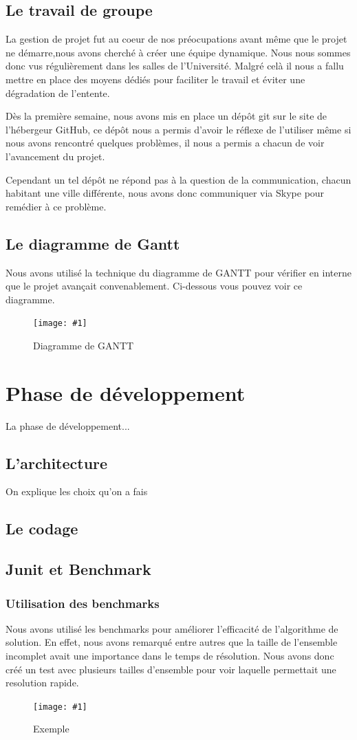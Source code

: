 ﻿\documentclass[a4paper,twoside,12pt]{report}
\newcommand{\monimage}[3]{
\par\noindent
\begin{figure}[H] %
\begin{center}
\texttt{[image: \#1]} %
\caption{#2} %
\label{#3} %
\end{center}
\end{figure} %
}
\begin{document}
\section{Le travail de groupe}
%
\par
La gestion de projet fut au coeur de nos préocupations avant même que le projet ne démarre,nous avons cherché à créer une équipe dynamique. Nous nous sommes donc vus régulièrement dans les salles de l'Université. Malgré celà il nous a fallu mettre en place des moyens dédiés pour faciliter le travail et éviter une dégradation de l'entente.
\par\noindent
 Dès la première semaine, nous avons mis en place un dépôt git sur le site de l'hébergeur GitHub, ce dépôt nous a permis d'avoir le réflexe de l'utiliser même  si nous avons rencontré quelques problèmes, il nous a permis a chacun de voir l'avancement du projet.
\par\noindent
 Cependant un tel dépôt ne répond pas à la question de la communication, chacun habitant une ville différente, nous avons donc communiquer via Skype pour remédier à ce problème.
\section{Le diagramme de Gantt}
%
\par
Nous avons utilisé la technique du diagramme de GANTT pour vérifier en interne que le projet avançait convenablement. Ci-dessous vous pouvez voir ce
diagramme.
\monimage{DiagrammeDeGantt.pdf}{Diagramme de GANTT}{DG}
\chapter{Phase de développement}
%
La phase de développement...
\section{L'architecture}
On explique les choix qu'on a fais
\section{Le codage}
%
\section{Junit et Benchmark}
%
\subsection{Utilisation des benchmarks}
\par
Nous avons utilisé les benchmarks pour améliorer l'efficacité de l'algorithme de solution. En effet, nous avons remarqué entre autres que la taille de l'ensemble incomplet avait une importance dans le temps de résolution. Nous avons donc créé un test avec plusieurs tailles d'ensemble pour voir laquelle permettait une resolution rapide.
\monimage{ensembleincomplettest2.pdf}{Exemple}{EX}
\end{document}
